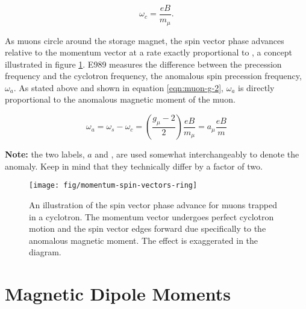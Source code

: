 \begin{equation}
\label{eqn:omega-c}
\omega_c = \frac{e B}{m_\mu}.
\end{equation}

\noindent
As muons circle around the storage magnet, the spin vector phase advances relative to the momentum vector at a rate exactly proportional to \gmtwo, a concept illustrated in figure \ref{fig:momentum-spin-vectors-ring}.  E989 measures the difference between the precession frequency and the cyclotron frequency, the anomalous spin precession frequency, $\omega_a$.  As stated above and shown in equation \ref{eqn:muon-g-2}, $\omega_a$ is directly proportional to the anomalous magnetic moment of the muon.

\begin{equation}
\label{eqn:muon-g-2}
\omega_a = \omega_s - \omega_c = \left( \frac{g_\mu - 2}{2} \right) \frac{e B}{m_\mu} = a_\mu \frac{e B}{m}
\end{equation}

\noindent
\textbf{Note:} the two labels, $a$ and \gmtwo, are used somewhat interchangeably to denote the anomaly.  Keep in mind that they technically differ by a factor of two.

\begin{figure}
\centering
\texttt{[image: fig/momentum-spin-vectors-ring]}
\caption{
    An illustration of the spin vector phase advance for muons trapped in a cyclotron.  The momentum vector undergoes perfect cyclotron motion and the spin vector edges forward due specifically to the anomalous magnetic moment.  The effect is exaggerated in the diagram. 
    \label{fig:momentum-spin-vectors-ring}
}
\end{figure}


\section{Magnetic Dipole Moments}

